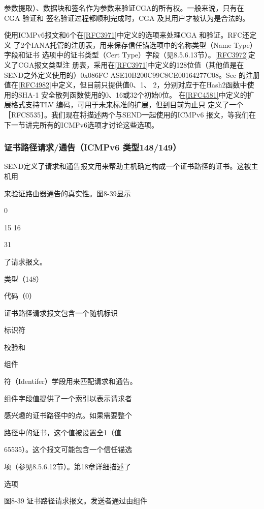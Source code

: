 参数提取）、数据块和签名作为参数来验证CGA的所有权。一般来说，只有在CGA 验证和
签名验证过程都顺利完成时，CGA 及其用户才被认为是合法的。

使用ICMPv6报文和6个在\href{https://www.rfc-editor.org/rfc/rfc3971}{[RFC3971]}中定义的选项来处理CGA 和验证。RFC还定义
了2个IANA托管的注册表，用来保存信任锚选项中的名称类型（Name Type）字段和证书
选项中的证书类型（Cert Type）字段（见8.5.6.13节）。\href{https://www.rfc-editor.org/rfc/rfc3972}{[RFC3972]}定义了CGA报文类型注
册表，采用在\href{https://www.rfc-editor.org/rfc/rfc3971}{[RFC3971]}中定义的128位值（其他值是在SEND之外定义使用的）0x086FC
ASE10B200C99C8CE00164277C08。Sec 的注册值在\href{https://www.rfc-editor.org/rfc/rfc4982}{[RFC4982]}中定义，但目前只提供值0、1、
2，分别对应于在Hash2函数中使用的SHA-1 安全散列函数使用的0、16或32个初始0位。
在\href{https://www.rfc-editor.org/rfc/rfc4581}{[RFC4581]}中定义的扩展格式支持TLV 编码，可用于未来标准的扩展，但到目前为止只
定义了一个［RFCS535］。我们现在将描述两个与SEND一起使用的ICMPv6 报文，等我们在
下一节讲完所有的ICMPv6选项才讨论这些选项。

\subsubsection{证书路径请求/通告（ICMPv6 类型148/149）}
SEND定义了请求和通告报文用来帮助主机确定构成一个证书路径的证书。这被主机用

来验证路由器通告的真实性。图8-39显示

0

15 16

31

了请求报文。

类型（148）

代码（0）

证书路径请求报文包含一个随机标识

标识符

校验和

组件

符（Identifer）学段用来匹配请求和通告。

组件字段值提供了一个索引以表示请求者

感兴趣的证书路径中的点。如果需要整个

路径中的证书，这个值被设置全1（值

65535）。这个报文可能包含一个信任锚选

项（参见8.5.6.12节）。第18章详细描述了

选项

图8-39 证书路径请求报文。发送者通过由组件

